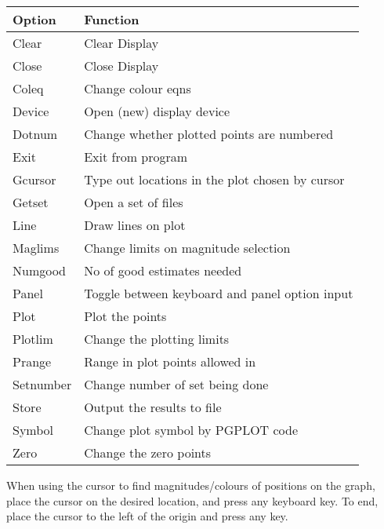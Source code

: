{{{\begin{tabular}{|l|l|}\hline 
  Option   &   Function \\ \hline
  Clear    &   Clear Display \\
  Close    &   Close Display  \\
  Coleq    &   Change colour eqns \\
  Device   &   Open (new) display device \\
  Dotnum   &   Change whether plotted points are numbered \\
  Exit     &   Exit from program \\
  Gcursor  &   Type out locations in the plot chosen by cursor \\
  Getset   &   Open a set of files \\
  Line     &   Draw lines on plot \\
  Maglims  &   Change limits on magnitude selection \\
  Numgood  &   No of good estimates needed  \\
  Panel    &   Toggle between keyboard and panel option input \\
  Plot     &   Plot the points \\
  Plotlim  &   Change the plotting limits \\
  Prange   &   Range in plot points allowed in \\
  Setnumber&   Change number of set being done \\
  Store    &   Output the results to file \\
  Symbol   &   Change plot symbol by PGPLOT code \\
  Zero     &   Change the zero points \\ \hline
\end{tabular}                                   

  When using the cursor to find magnitudes/colours of positions
  on the graph, place the cursor on the desired location, and
  press any keyboard key. To end, place the cursor to the left 
  of the origin and press any key.

}}}
